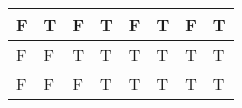 \begin{itemize}
\begin{enumerate}[a.]
\begin{tabular}{*{6}{|l} *{2}{|p{3.2cm}}|}
                        \hline
                        F          & T          & F          & T          & F         & T         & F                                              & T                                                    \\
                        \hline
                        F          & F          & T          & T          & T         & T         & T                                              & T                                                    \\
                        \hline
                        F          & F          & F          & T          & T         & T         & T                                              & T                                                    \\
                        \hline
                    \end{tabular}


\end{enumerate}
\end{itemize}
